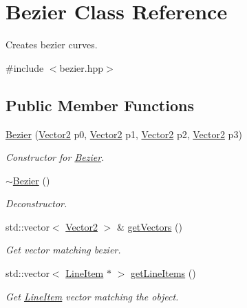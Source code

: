 \hypertarget{classBezier}{}\section{Bezier Class Reference}
\label{classBezier}


Creates bezier curves.  




{\ttfamily \#include $<$bezier.\+hpp$>$}

\subsection*{Public Member Functions}
\begin{DoxyCompactItemize}
\item 
\mbox{\hyperlink{classBezier_aeee0e41ed64d1a61d7ac103d2300093b}{Bezier}} (\mbox{\hyperlink{classVector2}{Vector2}} p0, \mbox{\hyperlink{classVector2}{Vector2}} p1, \mbox{\hyperlink{classVector2}{Vector2}} p2, \mbox{\hyperlink{classVector2}{Vector2}} p3)
\begin{DoxyCompactList}\small\item\em Constructor for \mbox{\hyperlink{classBezier}{Bezier}}. \end{DoxyCompactList}\item 
\mbox{\hyperlink{classBezier_a32f81ea72bd31a4607b4168839ea8815}{$\sim$\+Bezier}} ()
\begin{DoxyCompactList}\small\item\em Deconstructor. \end{DoxyCompactList}\item 
std\+::vector$<$ \mbox{\hyperlink{classVector2}{Vector2}} $>$ \& \mbox{\hyperlink{classBezier_a26bf332b0c831e0f302f1d72ec782436}{get\+Vectors}} ()
\begin{DoxyCompactList}\small\item\em Get vector matching bezier. \end{DoxyCompactList}\item 
\mbox{\label{classBezier_ad4417fabe40db932edc57406d1ab302a}} 
std\+::vector$<$ \mbox{\hyperlink{classLineItem}{Line\+Item}} $\ast$ $>$ \mbox{\hyperlink{classBezier_ad4417fabe40db932edc57406d1ab302a}{get\+Line\+Items}} ()
\begin{DoxyCompactList}\small\item\em Get \mbox{\hyperlink{classLineItem}{Line\+Item}} vector matching the object. \end{DoxyCompactList}\item 

\end{DoxyCompactItemize}
